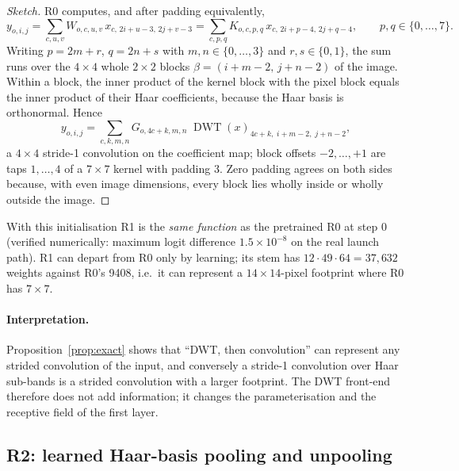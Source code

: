 \documentclass[11pt]{article}
\newcommand{\DWT}{\operatorname{DWT}}
\begin{document}
\begin{proof}[Sketch]
R0 computes, and after padding equivalently,
\begin{equation*}
  y_{o,i,j} = \sum_{c,u,v} W_{o,c,u,v}\,x_{c,\,2i+u-3,\,2j+v-3}
            = \sum_{c,p,q} K_{o,c,p,q}\,x_{c,\,2i+p-4,\,2j+q-4},\qquad p,q\in\{0,\dots,7\}.
\end{equation*}
Writing $p = 2m+r$, $q=2n+s$ with $m,n\in\{0,\dots,3\}$ and $r,s\in\{0,1\}$, the sum runs over the
$4\times4$ whole $2\times2$ blocks $\beta = (i+m-2,\,j+n-2)$ of the image. Within a block, the
inner product of the kernel block with the pixel block equals the inner product of their Haar
coefficients, because the Haar basis is orthonormal. Hence
\begin{equation*}
  y_{o,i,j} = \sum_{c,k,m,n} G_{o,4c+k,m,n}\;\DWT(x)_{4c+k,\;i+m-2,\;j+n-2},
\end{equation*}
a $4\times4$ stride-1 convolution on the coefficient map; block offsets $-2,\dots,+1$ are taps $1,\dots,4$ of a
$7\times7$ kernel with padding 3. Zero padding agrees on both sides because, with even image
dimensions, every block lies wholly inside or wholly outside the image.
\end{proof}

With this initialisation R1 is the \emph{same function} as the pretrained R0 at step 0 (verified
numerically: maximum logit difference $1.5\times10^{-8}$ on the real launch path). R1 can depart
from R0 only by learning; its stem has $12\cdot49\cdot64 = 37{,}632$ weights against R0's 9408, i.e.\
it can represent a $14\times14$-pixel footprint where R0 has $7\times7$.

\paragraph{Interpretation.} Proposition~\ref{prop:exact} shows that ``DWT, then convolution'' can
represent any strided convolution of the input, and conversely a stride-1 convolution over Haar
sub-bands is a strided convolution with a larger footprint. The DWT front-end therefore does not
add information; it changes the parameterisation and the receptive field of the first layer.

\subsection{R2: learned Haar-basis pooling and unpooling}
\end{document}
